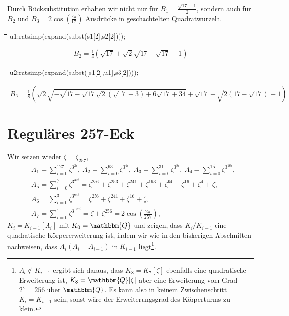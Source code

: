 \documentclass[11pt]{article}
\newcommand{\br}[1]{\ensuremath{\left(#1\right)}}
\newcommand{\Q}{\mathbbm{Q}}
\newenvironment{code}{\tt \begin{tabbing}
\hskip12pt\=\hskip12pt\=\hskip12pt\=\hskip12pt\=\hskip5cm\=\hskip5cm\=\kill}
{\end{tabbing}}
\begin{document}
Durch Rücksubstitution erhalten wir nicht nur für $B_1=\frac{\sqrt{17}-1}{2}$,
sondern auch für $B_2$ und $B_3=2\cos\br{\frac{2\pi}{17}}$ Ausdrücke in
geschachtelten Quadratwurzeln.
\begin{code}  
u1:ratsimp(expand(subst(s1[2],s2[2])));
\end{code}
\begin{gather*}
  B_2 = \frac14\br{\sqrt{17}+\sqrt{2}\sqrt{17-\sqrt{17}}-1} 
\end{gather*}
\begin{code}  
u2:ratsimp(expand(subst([s1[2],u1],s3[2])));
\end{code}
\begin{gather*}
  B_3 =\frac18\br{\sqrt{2}\sqrt{-\sqrt{17-\sqrt{17}}\sqrt{2}\br{\sqrt{17}+3}
      +6\sqrt{17}+34}
    +\sqrt{17}+\sqrt{2\br{17-\sqrt{17}}}-1}
\end{gather*}

\section{Reguläres 257-Eck}

Wir setzen wieder $\zeta=\zeta_{257}$,
\begin{align*}
  &A_1=\sum_{i=0}^{127}{\zeta^{3^{2i}}},\
  A_2=\sum_{i=0}^{63}{\zeta^{3^{4i}}},\
  A_3=\sum_{i=0}^{31}{\zeta^{3^{8i}}},\
  A_4=\sum_{i=0}^{15}{\zeta^{3^{16i}}},\\
  &A_5=\sum_{i=0}^{7}{\zeta^{3^{32i}}}=\zeta^{256}+\zeta^{253}+\zeta^{241}
  +\zeta^{193}+\zeta^{64}+\zeta^{16}+\zeta^4+\zeta,\\
  & A_6=\sum_{i=0}^{3}{\zeta^{3^{64i}}}=\zeta^{256}+\zeta^{241}+\zeta^{16}+\zeta,\\
  &A_7=\sum_{i=0}^1{\zeta^{3^{128i}}}=\zeta+\zeta^{256}=2\cos\br{\frac{2\pi}{257}},
\end{align*}
$K_i=K_{i-1}[A_i]$ mit $K_0=\Q$ und zeigen, dass $K_i/K_{i-1}$ eine
quadratische Körpererweiterung ist, indem wir wie in den bisherigen
Abschnitten nachweisen, dass $A_i\br{A_i-A_{i-1}}$ in $K_{i-1}$
liegt\footnote{$A_i\not\in K_{i-1}$ ergibt sich daraus, dass $K_8=K_7[\zeta]$
  ebenfalls eine quadratische Erweiterung ist, $K_8=\Q[\zeta]$ aber eine
  Erweiterung vom Grad $2^8=256$ über $\Q$. Es kann also in keinem
  Zwischenschritt $K_i=K_{i-1}$ sein, sonst wäre der Erweiterungsgrad des
  Körperturms zu klein.}.
\end{document}

